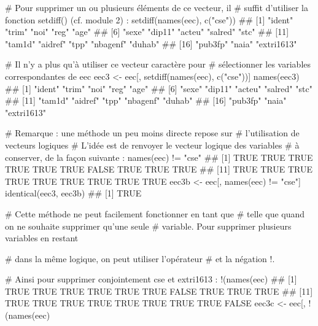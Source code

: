 \documentclass[12pt,twosided, notitlepage]{book}
\newenvironment{Shaded}{}{}
\newcommand{\CommentTok}[1]{\textcolor[rgb]{0.00,0.50,0.00}{#1}}
\newcommand{\KeywordTok}[1]{\textcolor[rgb]{0.00,0.00,1.00}{#1}}
\newcommand{\NormalTok}[1]{#1}
\newcommand{\OperatorTok}[1]{#1}
\newcommand{\StringTok}[1]{\textcolor[rgb]{0.00,0.50,0.50}{#1}}
\renewenvironment{Shaded}{\begin{snugshade}}{\end{snugshade}}
\begin{document}
\begin{enumerate}
\begin{enumerate}
\begin{Shaded}
\begin{Highlighting}[]
\CommentTok{# Pour supprimer un ou plusieurs éléments de ce vecteur, il }
\CommentTok{# suffit d'utiliser la fonction setdiff() (cf. module 2) : }
\KeywordTok{setdiff}\NormalTok{(}\KeywordTok{names}\NormalTok{(eec), }\KeywordTok{c}\NormalTok{(}\StringTok{"cse"}\NormalTok{))}
\NormalTok{  ##  [1] "ident"     "trim"      "noi"       "reg"       "age"      }
\NormalTok{  ##  [6] "sexe"      "dip11"     "acteu"     "salred"    "stc"      }
\NormalTok{  ## [11] "tam1d"     "aidref"    "tpp"       "nbagenf"   "duhab"    }
\NormalTok{  ## [16] "pub3fp"    "naia"      "extri1613"}

\CommentTok{# Il n'y a plus qu'à utiliser ce vecteur caractère pour }
\CommentTok{# sélectionner les variables correspondantes de eec}
\NormalTok{eec3 <-}\StringTok{ }\NormalTok{eec[, }\KeywordTok{setdiff}\NormalTok{(}\KeywordTok{names}\NormalTok{(eec), }\KeywordTok{c}\NormalTok{(}\StringTok{"cse"}\NormalTok{))]}
\KeywordTok{names}\NormalTok{(eec3)}
\NormalTok{  ##  [1] "ident"     "trim"      "noi"       "reg"       "age"      }
\NormalTok{  ##  [6] "sexe"      "dip11"     "acteu"     "salred"    "stc"      }
\NormalTok{  ## [11] "tam1d"     "aidref"    "tpp"       "nbagenf"   "duhab"    }
\NormalTok{  ## [16] "pub3fp"    "naia"      "extri1613"}

\CommentTok{# Remarque : une méthode un peu moins directe repose sur }
\CommentTok{# l'utilisation de vecteurs logiques }
\CommentTok{# L'idée est de renvoyer le vecteur logique des variables}
\CommentTok{# à conserver, de la façon suivante : }
\KeywordTok{names}\NormalTok{(eec) }\OperatorTok{!=}\StringTok{ "cse"}
\NormalTok{  ##  [1]  TRUE  TRUE  TRUE  TRUE  TRUE  TRUE FALSE  TRUE  TRUE  TRUE}
\NormalTok{  ## [11]  TRUE  TRUE  TRUE  TRUE  TRUE  TRUE  TRUE  TRUE  TRUE}
\NormalTok{eec3b <-}\StringTok{ }\NormalTok{eec[, }\KeywordTok{names}\NormalTok{(eec) }\OperatorTok{!=}\StringTok{ "cse"}\NormalTok{]}
\KeywordTok{identical}\NormalTok{(eec3, eec3b)}
\NormalTok{  ## [1] TRUE}

\CommentTok{# Cette méthode ne peut facilement fonctionner en tant que}
\CommentTok{# telle que quand on ne souhaite supprimer qu'une seule}
\CommentTok{# variable. Pour supprimer plusieurs variables en restant}
\CommentTok{# dans la même logique, on peut utiliser l'opérateur %
\CommentTok{# et la négation !. }

\CommentTok{# Ainsi pour supprimer conjointement cse et extri1613 : }
\OperatorTok{!}\NormalTok{(}\KeywordTok{names}\NormalTok{(eec) }\OperatorTok{%
\NormalTok{  ##  [1]  TRUE  TRUE  TRUE  TRUE  TRUE  TRUE FALSE  TRUE  TRUE  TRUE}
\NormalTok{  ## [11]  TRUE  TRUE  TRUE  TRUE  TRUE  TRUE  TRUE  TRUE FALSE}
\NormalTok{eec3c <-}\StringTok{ }\NormalTok{eec[, }\OperatorTok{!}\NormalTok{(}\KeywordTok{names}\NormalTok{(eec) }\OperatorTok{%

}}}
\end{Highlighting}
\end{Shaded}
\end{enumerate}
\end{enumerate}
\end{document}
